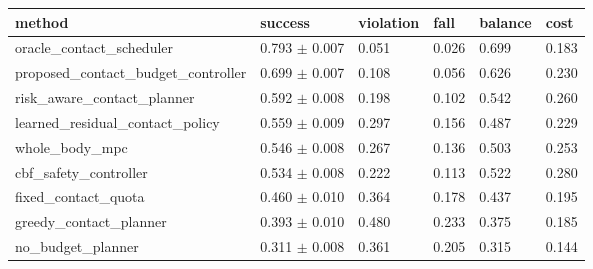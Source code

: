\begin{tabular}{llllll}
\toprule
method & success & violation & fall & balance & cost \\
\midrule
oracle\_contact\_scheduler & 0.793 $\pm$ 0.007 & 0.051 & 0.026 & 0.699 & 0.183 \\
proposed\_contact\_budget\_controller & 0.699 $\pm$ 0.007 & 0.108 & 0.056 & 0.626 & 0.230 \\
risk\_aware\_contact\_planner & 0.592 $\pm$ 0.008 & 0.198 & 0.102 & 0.542 & 0.260 \\
learned\_residual\_contact\_policy & 0.559 $\pm$ 0.009 & 0.297 & 0.156 & 0.487 & 0.229 \\
whole\_body\_mpc & 0.546 $\pm$ 0.008 & 0.267 & 0.136 & 0.503 & 0.253 \\
cbf\_safety\_controller & 0.534 $\pm$ 0.008 & 0.222 & 0.113 & 0.522 & 0.280 \\
fixed\_contact\_quota & 0.460 $\pm$ 0.010 & 0.364 & 0.178 & 0.437 & 0.195 \\
greedy\_contact\_planner & 0.393 $\pm$ 0.010 & 0.480 & 0.233 & 0.375 & 0.185 \\
no\_budget\_planner & 0.311 $\pm$ 0.008 & 0.361 & 0.205 & 0.315 & 0.144 \\
\bottomrule
\end{tabular}
